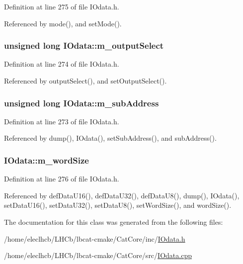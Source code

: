 Definition at line 275 of file IOdata.h.

Referenced by mode(), and setMode().\hypertarget{classIOdata_acc46d71243b542e68277e242effa7f1b}{
\subsubsection[{m\_\-outputSelect}]{\setlength{\rightskip}{0pt plus 5cm}unsigned long {\bf IOdata::m\_\-outputSelect}}}
\label{classIOdata_acc46d71243b542e68277e242effa7f1b}


Definition at line 274 of file IOdata.h.

Referenced by outputSelect(), and setOutputSelect().\hypertarget{classIOdata_a562f84e5cace1e392f1b0fca553fff78}{
\subsubsection[{m\_\-subAddress}]{\setlength{\rightskip}{0pt plus 5cm}unsigned long {\bf IOdata::m\_\-subAddress}}}
\label{classIOdata_a562f84e5cace1e392f1b0fca553fff78}


Definition at line 273 of file IOdata.h.

Referenced by dump(), IOdata(), setSubAddress(), and subAddress().\hypertarget{classIOdata_a719b0ce607ada4fa91b12d6ecfa1b4c9}{
\subsubsection[{m\_\-wordSize}]{ {\bf IOdata::m\_\-wordSize}}}
\label{classIOdata_a719b0ce607ada4fa91b12d6ecfa1b4c9}


Definition at line 276 of file IOdata.h.

Referenced by defDataU16(), defDataU32(), defDataU8(), dump(), IOdata(), setDataU16(), setDataU32(), setDataU8(), setWordSize(), and wordSize().

The documentation for this class was generated from the following files:\begin{DoxyCompactItemize}
\item 
/home/eleclhcb/LHCb/lbcat-\/cmake/CatCore/inc/\hyperlink{IOdata_8h}{IOdata.h}\item 
/home/eleclhcb/LHCb/lbcat-\/cmake/CatCore/src/\hyperlink{IOdata_8cpp}{IOdata.cpp}\end{DoxyCompactItemize}
